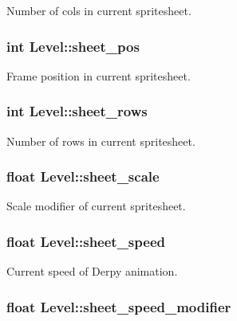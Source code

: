 \-Number of cols in current spritesheet. \hypertarget{structLevel_a21c699af201ffe60ccd1319b3f540947}{
\subsubsection[{sheet\-\_\-pos}]{\setlength{\rightskip}{0pt plus 5cm}int {\bf \-Level\-::sheet\-\_\-pos}}}\label{structLevel_a21c699af201ffe60ccd1319b3f540947}
\-Frame position in current spritesheet. \hypertarget{structLevel_a6d608b79c9b4dd8a5efc0c7e5fb482b0}{
\subsubsection[{sheet\-\_\-rows}]{\setlength{\rightskip}{0pt plus 5cm}int {\bf \-Level\-::sheet\-\_\-rows}}}\label{structLevel_a6d608b79c9b4dd8a5efc0c7e5fb482b0}
\-Number of rows in current spritesheet. \hypertarget{structLevel_a267a140bd3de1fc3f23a88623de425ed}{
\subsubsection[{sheet\-\_\-scale}]{\setlength{\rightskip}{0pt plus 5cm}float {\bf \-Level\-::sheet\-\_\-scale}}}\label{structLevel_a267a140bd3de1fc3f23a88623de425ed}
\-Scale modifier of current spritesheet. \hypertarget{structLevel_a41db1345ac158898450907010a49748f}{
\subsubsection[{sheet\-\_\-speed}]{\setlength{\rightskip}{0pt plus 5cm}float {\bf \-Level\-::sheet\-\_\-speed}}}\label{structLevel_a41db1345ac158898450907010a49748f}
\-Current speed of \-Derpy animation. \hypertarget{structLevel_a3cae10fd441bcc14b6a47dd5fedafa59}{
\subsubsection[{sheet\-\_\-speed\-\_\-modifier}]{\setlength{\rightskip}{0pt plus 5cm}float {\bf \-Level\-::sheet\-\_\-speed\-\_\-modifier}}}\label{structLevel_a3cae10fd441bcc14b6a47dd5fedafa59}
